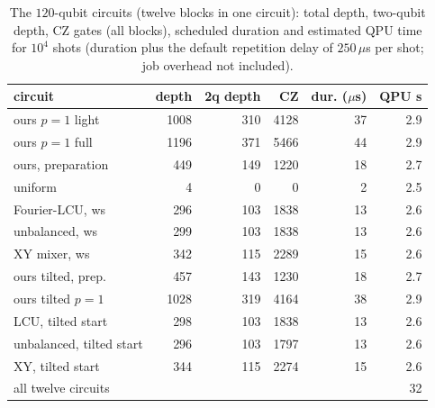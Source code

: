 \begin{table}[t]\centering\scriptsize\setlength{\tabcolsep}{2pt}
\caption{ The $120$-qubit circuits (twelve blocks in one circuit): total depth, two-qubit depth, CZ gates (all blocks), scheduled duration and estimated QPU time for $10^4$ shots (duration plus the default repetition delay of $250\,\mu$s per shot; job overhead not included).}\label{tab:hw100_cost}
\begin{tabular}{lrrrrr}\toprule
circuit & depth & 2q depth & CZ & dur. ($\mu$s) & QPU s\\\midrule
ours $p{=}1$ light & 1008 & 310 & 4128 & 37 & 2.9\\
ours $p{=}1$ full & 1196 & 371 & 5466 & 44 & 2.9\\
ours, preparation & 449 & 149 & 1220 & 18 & 2.7\\
uniform & 4 & 0 & 0 & 2 & 2.5\\
Fourier-LCU, ws & 296 & 103 & 1838 & 13 & 2.6\\
unbalanced, ws & 299 & 103 & 1838 & 13 & 2.6\\
XY mixer, ws & 342 & 115 & 2289 & 15 & 2.6\\
ours tilted, prep. & 457 & 143 & 1230 & 18 & 2.7\\
ours tilted $p{=}1$ & 1028 & 319 & 4164 & 38 & 2.9\\
LCU, tilted start & 298 & 103 & 1838 & 13 & 2.6\\
unbalanced, tilted start & 296 & 103 & 1797 & 13 & 2.6\\
XY, tilted start & 344 & 115 & 2274 & 15 & 2.6\\
\midrule
all twelve circuits & & & & & 32\\
\bottomrule\end{tabular}\end{table}

